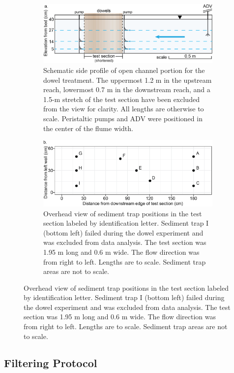 \documentclass[12pt]{article}
\begin{document}
\begin{figure}[H]
    \centering
    \caption{Flume Instrument Diagrams}
    \begin{subfigure}{1\textwidth}
        \centering
        \includegraphics[width=6.5in]{flume_side_schematic.png}
        \caption{Schematic side profile of open channel portion for the dowel treatment. The uppermost 1.2 m in the upstream reach, lowermost 0.7 m in the downstream reach, and a 1.5-m stretch of the test section have been excluded from the view for clarity. All lengths are otherwise to scale. Peristaltic pumps and ADV were positioned in the center of the flume width.}
        \label{fig_flumeschematic}
    \end{subfigure}
    \begin{subfigure}{1\textwidth}
        \centering
        \includegraphics[width=6.5in]{flume_ts_schematic.png}
        \caption{Overhead view of sediment trap positions in the test section labeled by identification letter. Sediment trap I (bottom left) failed during the dowel experiment and was excluded from data analysis. The test section was 1.95 m long and 0.6 m wide. The flow direction was from right to left. Lengths are to scale. Sediment trap areas are not to scale.}
        \label{fig_traps}
    \end{subfigure}
\end{figure}

\subsection{Filtering Protocol}
\end{document}
